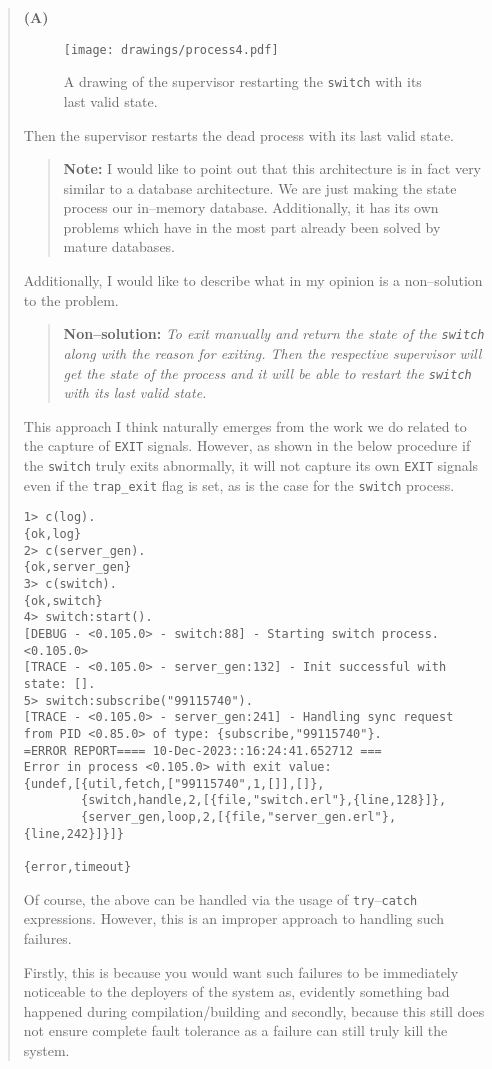 \documentclass{article}
\newenvironment{ans}
    {\begin{quote}{\large\textbf{(A)}}\\\vspace{5pt}}
    {\end{quote}}
\begin{document}
\begin{ans}
\begin{figure}[H]
  \centering
  \texttt{[image: drawings/process4.pdf]}
  \caption{A drawing of the supervisor restarting the
  \texttt{switch} with its last valid state.}
\end{figure}

Then the supervisor restarts the dead process with its last
valid state.

\begin{quote}
  \textbf{Note:} I would like to point out that this
  architecture is in fact very similar to a database
  architecture. We are just making the state process our
  in--memory database. Additionally, it has its own problems
  which have in the most part already been solved by mature
  databases.
\end{quote}

Additionally, I would like to describe what in my opinion is a
non--solution to the problem.

\begin{quote}
  \textbf{Non--solution:} \textit{To exit manually and return
    the state of the \texttt{switch} along with the reason for
    exiting. Then the respective supervisor will get the state
    of the process and it will be able to restart the
  \texttt{switch} with its last valid state.}
\end{quote}

This approach I think naturally emerges from the work we do
related to the capture of \texttt{EXIT} signals. However, as
shown in the below procedure if the \texttt{switch} truly exits
abnormally, it will not capture its own \texttt{EXIT} signals
even if the \texttt{trap\_exit} flag is set, as is the case for
the \texttt{switch} process.

\begin{lstlisting}[basicstyle=\small\ttfamily,breaklines=true]
1> c(log).
{ok,log}
2> c(server_gen).
{ok,server_gen}
3> c(switch).
{ok,switch}
4> switch:start().
[DEBUG - <0.105.0> - switch:88] - Starting switch process.
<0.105.0>
[TRACE - <0.105.0> - server_gen:132] - Init successful with state: [].
5> switch:subscribe("99115740").
[TRACE - <0.105.0> - server_gen:241] - Handling sync request from PID <0.85.0> of type: {subscribe,"99115740"}.
=ERROR REPORT==== 10-Dec-2023::16:24:41.652712 ===
Error in process <0.105.0> with exit value:
{undef,[{util,fetch,["99115740",1,[]],[]},
        {switch,handle,2,[{file,"switch.erl"},{line,128}]},
        {server_gen,loop,2,[{file,"server_gen.erl"},{line,242}]}]}

{error,timeout}
\end{lstlisting}

Of course, the above can be handled via the usage of
\texttt{try}--\texttt{catch} expressions. However, this is an
improper approach to handling such failures.

Firstly, this is because you would want such failures to be
immediately noticeable to the deployers of the system as,
evidently something bad happened during compilation/building and
secondly, because this still does not ensure complete fault
tolerance as a failure can still truly kill the system. 

\end{ans}
\end{document}
